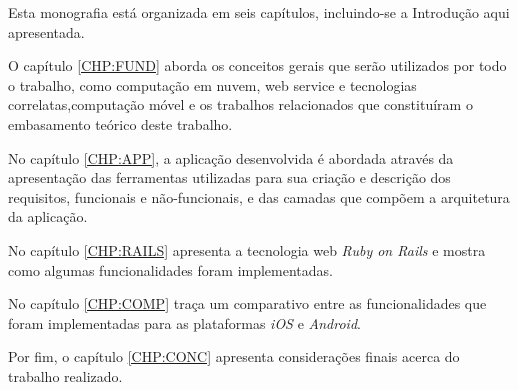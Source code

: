 Esta monografia está organizada em seis capítulos, incluindo-se a Introdução aqui apresentada.

O capítulo \ref{CHP:FUND} aborda os conceitos gerais que serão utilizados por todo o trabalho, como computação em nuvem, web service e tecnologias correlatas,computação móvel e os trabalhos  relacionados que constituíram o embasamento teórico deste trabalho.

  No capítulo \ref{CHP:APP}, a aplicação desenvolvida é abordada através da apresentação das ferramentas utilizadas para sua criação e descrição dos requisitos, funcionais e não-funcionais, e das camadas que compõem a arquitetura da aplicação.
  
No capítulo \ref{CHP:RAILS} apresenta a tecnologia web \emph{Ruby on Rails} e mostra como algumas funcionalidades foram implementadas.

No capítulo \ref{CHP:COMP} traça um comparativo entre as funcionalidades que foram implementadas para as plataformas \emph{iOS} e \emph{Android}.


Por fim, o capítulo \ref{CHP:CONC} apresenta considerações finais acerca do trabalho realizado.
